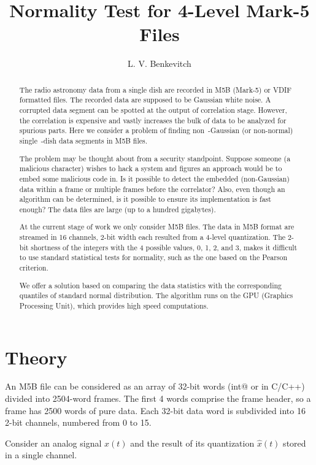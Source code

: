 \documentclass[letterpaper,twoside,12pt]{article}
\title{Normality Test for 4-Level Mark-5 Files}
\author[1]{L. V. Benkevitch}
\affil[1]{\small MIT Haystack observatory, Westford, MA 01886, USA.}
\begin{document}
\maketitle

\begin{abstract}
The radio astronomy data from a single dish are recorded in M5B (Mark-5) or VDIF formatted files. The recorded data are supposed to be Gaussian white noise. A corrupted data segment can be spotted at the output of correlation stage. However, the correlation is expensive and vastly increases the bulk of data to be analyzed for spurious parts. Here we consider a problem of finding non~-Gaussian (or non-normal) single~-dish data segments in M5B files.

The problem may be thought about from a security standpoint. Suppose someone (a malicious character) wishes to hack a system and figures an approach would be to embed some malicious code in. Is it possible to detect the embedded (non-Gaussian) data within a frame or multiple frames before the correlator? Also, even though an algorithm can be determined, is it possible to ensure its implementation is fast enough? The data files are large (up to a hundred gigabytes).

At the current stage of work we only consider M5B files. The data in M5B format are streamed in 16 channels, 2-bit width each resulted from a 4-level quantization. The 2-bit shortness of the integers with the 4 possible values, 0, 1, 2, and 3, makes it difficult to use standard statistical tests for normality, such as the one based on the Pearson criterion.     
 
We offer a solution based on comparing the data statistics with the corresponding quantiles of standard normal distribution. The algorithm runs on the GPU (Graphics Processing Unit), which provides high speed computations.
\end{abstract}


\section{Theory}

An M5B file can be considered as an array of 32-bit words (\verb@unsigned int@ or  \verb@uint@ in C/C++) divided into 2504-word frames. The first 4 words comprise the frame header, so a frame has 2500 words of pure data. Each 32-bit data word is subdivided into 16 2-bit channels, numbered from 0 to 15. 

Consider an analog signal $x(t)$ and the result of its quantization $\hat{x}(t)$ stored in a single channel.
\end{document}
